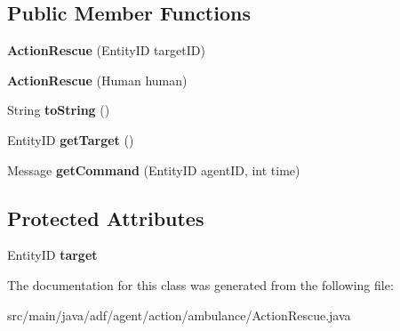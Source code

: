 \subsection*{Public Member Functions}
\begin{DoxyCompactItemize}
\item 
\hypertarget{classadf_1_1agent_1_1action_1_1ambulance_1_1ActionRescue_a775f329369155fafbacbfe011205a028}{}\label{classadf_1_1agent_1_1action_1_1ambulance_1_1ActionRescue_a775f329369155fafbacbfe011205a028} 
{\bfseries Action\+Rescue} (Entity\+ID target\+ID)
\item 
\hypertarget{classadf_1_1agent_1_1action_1_1ambulance_1_1ActionRescue_a31dc4b96abd6a526b0942971814efb75}{}\label{classadf_1_1agent_1_1action_1_1ambulance_1_1ActionRescue_a31dc4b96abd6a526b0942971814efb75} 
{\bfseries Action\+Rescue} (Human human)
\item 
\hypertarget{classadf_1_1agent_1_1action_1_1ambulance_1_1ActionRescue_a5543738527ed1ac96dee4c3248c9edca}{}\label{classadf_1_1agent_1_1action_1_1ambulance_1_1ActionRescue_a5543738527ed1ac96dee4c3248c9edca} 
String {\bfseries to\+String} ()
\item 
\hypertarget{classadf_1_1agent_1_1action_1_1ambulance_1_1ActionRescue_a526187da7c7b537cd8ec6f297b3a66e0}{}\label{classadf_1_1agent_1_1action_1_1ambulance_1_1ActionRescue_a526187da7c7b537cd8ec6f297b3a66e0} 
Entity\+ID {\bfseries get\+Target} ()
\item 
\hypertarget{classadf_1_1agent_1_1action_1_1ambulance_1_1ActionRescue_a74d4a3b6d9a649e96ec40cf323d1e416}{}\label{classadf_1_1agent_1_1action_1_1ambulance_1_1ActionRescue_a74d4a3b6d9a649e96ec40cf323d1e416} 
Message {\bfseries get\+Command} (Entity\+ID agent\+ID, int time)
\end{DoxyCompactItemize}
\subsection*{Protected Attributes}
\begin{DoxyCompactItemize}
\item 
\hypertarget{classadf_1_1agent_1_1action_1_1ambulance_1_1ActionRescue_a4280350fbfd1d62e5bc45affcebfe701}{}\label{classadf_1_1agent_1_1action_1_1ambulance_1_1ActionRescue_a4280350fbfd1d62e5bc45affcebfe701} 
Entity\+ID {\bfseries target}
\end{DoxyCompactItemize}


The documentation for this class was generated from the following file\+:\begin{DoxyCompactItemize}
\item 
src/main/java/adf/agent/action/ambulance/Action\+Rescue.\+java\end{DoxyCompactItemize}
